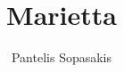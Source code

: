 \documentclass[a4paper,9pt]{article}
\title{Marietta}
\author{Pantelis Sopasakis}
\begin{document}
\newcommand{\primbool}{\textcolor{blue}{bool}}
\newcommand{\primint}{\textcolor{blue}{int}}
\newcommand{\primdouble}{\textcolor{blue}{double}}
\newcommand{\primstructure}{\textcolor{magenta}{structure}}







\end{document}
